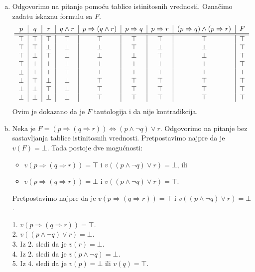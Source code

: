 \begin{enumerate}[(a)]
\item Odgovorimo na pitanje pomo\' cu tablice istinitosnih vrednosti. Ozna\v cimo zadatu iskaznu formulu sa $F$.
\[\begin{tabular}{c|c|c|c|c|c|c|c|c}
$p$ & $q$ & $r$ & $q\wedge r$ & $p\Rightarrow(q\wedge r)$ & $p\Rightarrow q$ & $p\Rightarrow r$ & $(p\Rightarrow q)\wedge(p\Rightarrow r)$ & $F$\\
\hline\hline
$\top$ & $\top$ & $\top$ & $\top$ & $\top$ & $\top$ & $\top$ & $\top$ & $\top$\\
$\top$ & $\top$ & $\bot$ & $\bot$ & $\bot$ & $\top$ & $\bot$ & $\bot$ & $\top$\\
$\top$ & $\bot$ & $\top$ & $\bot$ & $\bot$ & $\bot$ & $\top$ & $\bot$ & $\top$\\
$\top$ & $\bot$ & $\bot$ & $\bot$ & $\bot$ & $\bot$ & $\bot$ & $\bot$ & $\top$\\
$\bot$ & $\top$ & $\top$ & $\top$ & $\top$ & $\top$ & $\top$ & $\top$ & $\top$\\
$\bot$ & $\top$ & $\bot$ & $\bot$ & $\top$ & $\top$ & $\top$ & $\top$ & $\top$\\
$\bot$ & $\bot$ & $\top$ & $\bot$ & $\top$ & $\top$ & $\top$ & $\top$ & $\top$\\
$\bot$ & $\bot$ & $\bot$ & $\bot$ & $\top$ & $\top$ & $\top$ & $\top$ & $\top$\\
\end{tabular}\]
Ovim je dokazano da je $F$ tautologija i da nije kontradikcija.

\item %
%
Neka je $F=(p\Rightarrow(q\Rightarrow r))\Leftrightarrow (p\wedge \neg q)\vee r$. Odgovorimo na pitanje bez sastavljanja tablice istinitosnih vrednosti. Pretpostavimo najpre da je $v(F)=\bot$. Tada postoje dve mogu\' cnosti:
\begin{itemize}
\item $v(p\Rightarrow(q\Rightarrow r))=\top$ i $v((p\wedge \neg q)\vee r)=\bot$, ili
\item $v(p\Rightarrow(q\Rightarrow r))=\bot$ i $v((p\wedge \neg q)\vee r)=\top$.
\end{itemize}
Pretpostavimo najpre da je $v(p\Rightarrow(q\Rightarrow r))=\top$ i $v((p\wedge \neg q)\vee r)=\bot$.

1. $v(p\Rightarrow(q\Rightarrow r))=\top$.\\
2. $v((p\wedge \neg q)\vee r)=\bot$.\\
3. Iz 2. sledi da je $v(r)=\bot$.\\
4. Iz 2. sledi da je $v(p\wedge\neg q)=\bot$.\\
5. Iz 4. sledi da je $v(p)=\bot\text{ ili }v(q)=\top$.


\end{enumerate}
